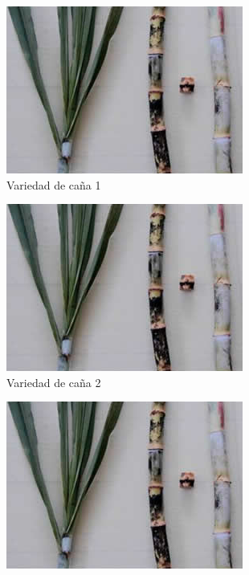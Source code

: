 \documentclass{article}%
\begin{document}
\begin{figure}[h!]%
\begin{subfigure}{0.33\linewidth}%
\includegraphics[width=0.95\linewidth]{Cana/RD75-11.png}%
\caption{Variedad de caña 1}%
\end{subfigure}%
\begin{subfigure}{0.33\linewidth}%
\includegraphics[width=0.95\linewidth]{Cana/RD75-11.png}%
\caption{Variedad de caña 2}%
\end{subfigure}%
\begin{subfigure}{0.33\linewidth}%
\includegraphics[width=0.95\linewidth]{Cana/RD75-11.png}%

\end{subfigure}
\end{figure}
\end{document}
